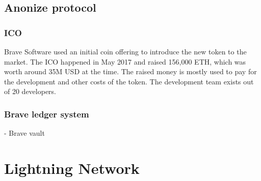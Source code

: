 \subsection{Anonize protocol}


\subsubsection{ICO}
Brave Software used an initial coin offering to introduce the new token to the market. The ICO happened in May 2017 and raised 156,000 ETH, which was worth around 35M USD at the time. The raised money is mostly used to pay for the development and other costs of the token. The development team exists out of 20 developers.

\subsubsection{Brave ledger system}

- Brave vault

\subsection{}


\section{Lightning Network}


